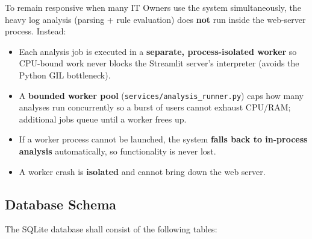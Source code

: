 \documentclass[12pt,a4paper]{article}
\begin{document}
To remain responsive when many IT Owners use the system simultaneously, the heavy
log analysis (parsing + rule evaluation) does \textbf{not} run inside the web-server
process. Instead:

\begin{itemize}
    \item Each analysis job is executed in a \textbf{separate, process-isolated worker}
          so CPU-bound work never blocks the
          Streamlit server's interpreter (avoids the Python GIL bottleneck).
    \item A \textbf{bounded worker pool} (\texttt{services/analysis\_runner.py}) caps how
          many analyses run concurrently so a burst of users cannot exhaust CPU/RAM;
          additional jobs queue until a worker frees up.
    \item If a worker process cannot be launched, the system \textbf{falls back to
          in-process analysis} automatically, so functionality is never lost.
    \item A worker crash is \textbf{isolated} and cannot bring down the web server.
\end{itemize}

\subsection{Database Schema}

The SQLite database shall consist of the following tables:
\end{document}
